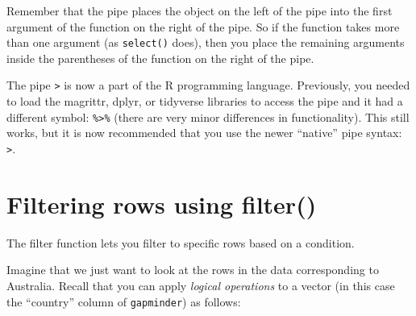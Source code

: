 \documentclass[
  letterpaper,
  DIV=11,
  numbers=noendperiod]{scrreprt}
\newenvironment{Shaded}{\begin{snugshade}}{\end{snugshade}}
\newcommand{\NormalTok}[1]{\textcolor[rgb]{0.00,0.23,0.31}{#1}}
\newcommand{\SpecialCharTok}[1]{\textcolor[rgb]{0.37,0.37,0.37}{#1}}
\newcommand{\StringTok}[1]{\textcolor[rgb]{0.13,0.47,0.30}{#1}}
\begin{document}
Remember that the pipe places the object on the left of the pipe into
the first argument of the function on the right of the pipe. So if the
function takes more than one argument (as \texttt{select()} does), then
you place the remaining arguments inside the parentheses of the function
on the right of the pipe.

\begin{tcolorbox}[enhanced jigsaw, rightrule=.15mm, toptitle=1mm, title=\textcolor{quarto-callout-tip-color}{\faLightbulb}\hspace{0.5em}{The ``new'' pipe \texttt{\textbar{}\textgreater{}} versus the ``old''
pipe \texttt{\%\textgreater{}\%}}, leftrule=.75mm, bottomtitle=1mm, colbacktitle=quarto-callout-tip-color!10!white, coltitle=black, titlerule=0mm, opacityback=0, colframe=quarto-callout-tip-color-frame, arc=.35mm, opacitybacktitle=0.6, bottomrule=.15mm, left=2mm, breakable, toprule=.15mm, colback=white]

The pipe \texttt{\textbar{}\textgreater{}} is now a part of the R
programming language. Previously, you needed to load the magrittr,
dplyr, or tidyverse libraries to access the pipe and it had a different
symbol: \texttt{\%\textgreater{}\%} (there are very minor differences in
functionality). This still works, but it is now recommended that you use
the newer ``native'' pipe syntax: \texttt{\textbar{}\textgreater{}}.

\end{tcolorbox}

\section{Filtering rows using
filter()}\label{filtering-rows-using-filter}

The filter function lets you filter to specific rows based on a
condition.

Imagine that we just want to look at the rows in the data corresponding
to Australia. Recall that you can apply \emph{logical operations} to a
vector (in this case the ``country'' column of \texttt{gapminder}) as
follows:

\begin{Shaded}
\end{Shaded}
\end{document}
